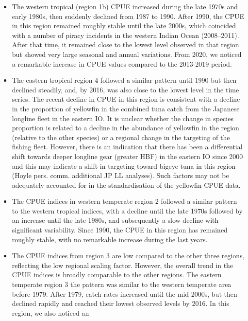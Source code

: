 \documentclass[
]{scrartcl}
\begin{document}
\begin{itemize}
\item
  The western tropical (region 1b) CPUE increased during the late 1970s
  and early 1980s, then suddenly declined from 1987 to 1990. After 1990,
  the CPUE in this region remained roughly stable until the late 2000s,
  which coincided with a number of piracy incidents in the western
  Indian Ocean (2008--2011). After that time, it remained close to the
  lowest level observed in that region but showed very large seasonal
  and annual variations. From 2020, we noticed a remarkable increase in
  CPUE values compared to the 2013-2019 period.
\item
  The eastern tropical region 4 followed a similar pattern until 1990
  but then declined steadily, and, by 2016, was also close to the lowest
  level in the time series. The recent decline in CPUE in this region is
  consistent with a decline in the proportion of yellowfin in the
  combined tuna catch from the Japanese longline fleet in the eastern
  IO. It is unclear whether the change in species proportion is related
  to a decline in the abundance of yellowfin in the region (relative to
  the other species) or a regional change in the targeting of the
  fishing fleet. However, there is an indication that there has been a
  differential shift towards deeper longline gear (greater HBF) in the
  eastern IO since 2000 and this may indicate a shift in targeting
  toward bigeye tuna in this region (Hoyle pers. comm. additional JP LL
  analyses). Such factors may not be adequately accounted for in the
  standardisation of the yellowfin CPUE data.
\item
  The CPUE indices in western temperate region 2 followed a similar
  pattern to the western tropical indices, with a decline until the late
  1970s followed by an increase until the late 1980s, and subsequently a
  slow decline with significant variability. Since 1990, the CPUE in
  this region has remained roughly stable, with no remarkable increase
  during the last years.
\item
  The CPUE indices from region 3 are low compared to the other three
  regions, reflecting the low regional scaling factor. However, the
  overall trend in the CPUE indices is broadly comparable to the other
  regions. The eastern temperate region 3 the pattern was similar to the
  western temperate area before 1979. After 1979, catch rates increased
  until the mid-2000s, but then declined rapidly and reached their
  lowest observed levels by 2016. In this region, we also noticed an

\end{itemize}
\end{document}
